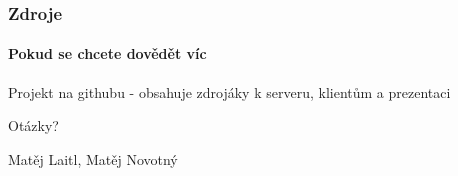 \documentclass[12pt]{beamer}
\begin{document}

\begin{frame}
  \frametitle{Zdroje}
  \framesubtitle{Pokud se chcete dovědět víc}
  \begin{thebibliography}{10}

  \beamertemplatearticlebibitems

    Projekt na githubu - obsahuje zdrojáky k serveru, klientům a prezentaci

  \end{thebibliography}
\end{frame}

\begin{frame}
  \vspace{2cm}
  {\huge Otázky?}

  \vspace{3cm}
  \begin{flushright}
    Matěj Laitl, Matěj Novotný

  \end{flushright}
\end{frame}
\end{document}
